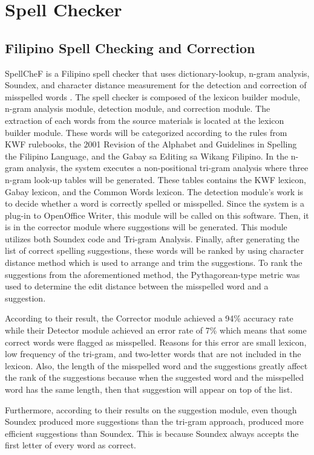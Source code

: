 \documentclass[12pt]{book}
\begin{document}
\section{Spell Checker}
\subsection{Filipino Spell Checking and Correction}
SpellCheF is a Filipino spell checker that uses dictionary-lookup, n-gram analysis, Soundex, and character distance measurement for the detection and correction of misspelled words \cite{cheng2007spellchef}. 
The spell checker is composed of the lexicon builder module, n-gram analysis module, detection module, and correction module. The extraction of each words from the source materials is located at the lexicon builder module. These words will be categorized according to the rules from KWF rulebooks, the 2001 Revision of the Alphabet and Guidelines in Spelling the Filipino Language, and the Gabay sa Editing sa Wikang Filipino. In the n-gram analysis, the system executes a non-positional tri-gram analysis where three n-gram look-up tables will be generated. These tables contains the KWF lexicon, Gabay lexicon, and the Common Words lexicon. The detection module’s work is to decide whether a word is correctly spelled or misspelled. Since the system is a plug-in to OpenOffice Writer, this module will be called on this software. Then, it is in the corrector module where suggestions will be generated. This module utilizes both Soundex code and Tri-gram Analysis. Finally, after generating the list of correct spelling suggestions, these words will be ranked by using character distance method which is used to arrange and trim the suggestions. To rank the suggestions from the aforementioned method, the Pythagorean-type metric was used to determine the edit distance between the misspelled word and a suggestion.

According to their result, the Corrector module achieved a 94\% accuracy rate while their Detector module achieved an error rate of 7\% which means that some correct words were flagged as misspelled. Reasons for this error are small lexicon, low frequency of the tri-gram, and two-letter words that are not included in the lexicon. Also, the length of the misspelled word and the suggestions greatly affect the rank of the suggestions because when the suggested word and the misspelled word has the same length, then that suggestion will appear on top of the list.

Furthermore, according to their results on the suggestion module, even though Soundex produced more suggestions than the tri-gram approach, produced more efficient suggestions than Soundex. This is because Soundex always accepts the first letter of every word as correct.
\end{document}
